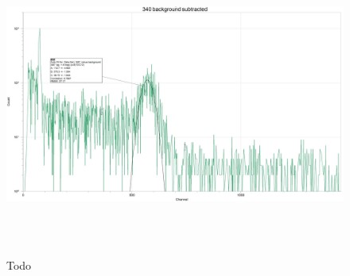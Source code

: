 \documentclass[fleqn]{article}
\begin{document}
  \begin{figure}[htbp]
    \includegraphics[height=10cm, width=18cm]{Eleven.JPG}
    \caption{
      Todo
    }
  \end{figure}

  \pagebreak
\end{document}
